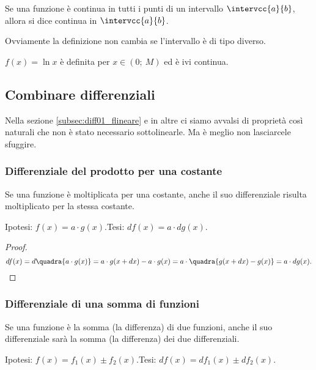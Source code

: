 \begin{definizione}
Se una funzione è continua in tutti i punti di un intervallo 
$\intervcc{a}{b}$,
allora si dice continua in $\intervcc{a}{b}$.
\end{definizione}
\begin{osservazione}
 Ovviamente la definizione non cambia se l'intervallo è di tipo diverso.
\end{osservazione}

\begin{esempio}
 $f(x)=\ln x$ è definita per $x \in (0;\ M)$ ed è ivi continua.
\end{esempio}


\subsection{Combinare differenziali}
\label{subsec:diff01_combdiff}
Nella sezione \ref{subsec:diff01_flineare} e in altre ci siamo avvalsi di 
proprietà così naturali che non è stato necessario sottolinearle. 
Ma è meglio non lasciarcele sfuggire.

\subsubsection{Differenziale del prodotto per una costante}
\label{}
\begin{teorema}
 Se una funzione è moltiplicata per una costante, anche il suo differenziale 
risulta 
 moltiplicato per la stessa costante.
\end{teorema}
\noindent Ipotesi: $f(x)=a\cdot g(x)$.\tab Tesi: $df(x)=a\cdot dg(x)$.

\begin{proof}
\[
 df(x)=d\quadra{a\cdot g(x)}= a\cdot g(x+dx)-a\cdot 
g(x)=a\cdot\quadra{g(x+dx)-g(x)}
 =a\cdot dg(x).
\]
\end{proof}

\subsubsection{Differenziale di una somma di funzioni}
\label{}

\begin{teorema}
 Se una funzione è la somma (la differenza) di due funzioni, anche il suo 
 differenziale sarà la somma (la differenza) dei due differenziali.
\end{teorema}
\noindent Ipotesi: $f(x)=f_1(x)\pm f_2(x)$.\tab Tesi: $df(x)=df_1(x)\pm 
df_2(x)$.

